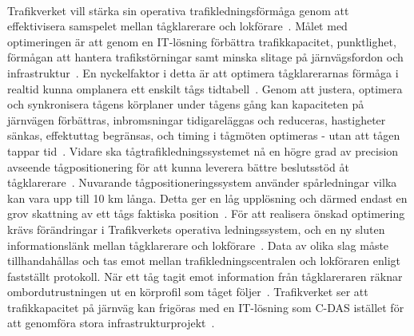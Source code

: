 \paragraph{}
\hspace{-11}Trafikverket vill stärka sin operativa trafikledningsförmåga genom att effektivisera samspelet mellan tågklarerare och lokförare~\cite{Angel2020}.
Målet med optimeringen är att genom en IT-lösning förbättra trafikkapacitet, punktlighet, förmågan att hantera trafikstörningar samt minska slitage på järnvägsfordon och infrastruktur~\cite{Angel2020, Joborn2023, Lindmark2022, Systemdefinition2019}.
En nyckelfaktor i detta är att optimera tågklarerarnas förmåga i realtid kunna omplanera ett enskilt tågs tidtabell~\cite{Joborn2023}.
Genom att justera, optimera och synkronisera tågens körplaner under tågens gång kan kapaciteten på järnvägen förbättras, inbromsningar tidigareläggas och reduceras, hastigheter sänkas, effektuttag begränsas, och timing i tågmöten optimeras - utan att tågen tappar tid~\cite{Angel2020, Joborn2023, Ketech2022, Lindmark2022, Olsson2023, Yao2022}.
Vidare ska tågtrafikledningssystemet nå en högre grad av precision avseende tågpositionering för att kunna leverera bättre beslutsstöd åt tågklarerare~\cite{Systemdefinition2019}.
Nuvarande tågpositioneringssystem använder spårledningar vilka kan vara upp till 10 km långa.
Detta ger en låg upplösning och därmed endast en grov skattning av ett tågs faktiska position~\cite{Systemdefinition2019}.
För att realisera önskad optimering krävs förändringar i Trafikverkets operativa ledningssystem, och en ny sluten informationslänk mellan tågklarerare och lokförare~\cite{Joborn2023, Systemdefinition2019}.
Data av olika slag måste tillhandahållas och tas emot mellan trafikledningscentralen och lokföraren enligt fastställt protokoll.
När ett tåg tagit emot information från tågklareraren räknar ombordutrustningen ut en körprofil som tåget följer~\cite{Joborn2023}.
Trafikverket ser att trafikkapacitet på järnväg kan frigöras med en IT-lösning som C-DAS istället för att genomföra stora infrastrukturprojekt~\cite{Lindmark2022}.
